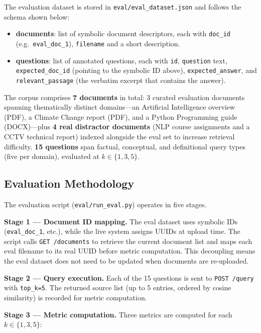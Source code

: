\documentclass[10pt]{article}
\begin{document}
The evaluation dataset is stored in \texttt{eval/eval\_dataset.json} and
follows the schema shown below:

\begin{itemize}
  \item \textbf{documents}: list of symbolic document descriptors, each with
        \texttt{doc\_id} (e.g.\ \texttt{eval\_doc\_1}), \texttt{filename}
 and a short description.
  \item \textbf{questions}: list of annotated questions, each with
        \texttt{id}, \texttt{question} text, \texttt{expected\_doc\_id}
        (pointing to the symbolic ID above), \texttt{expected\_answer}, and
        \texttt{relevant\_passage} (the verbatim excerpt that contains the answer).
\end{itemize}

The corpus comprises \textbf{7 documents} in total: 3 curated evaluation
documents spanning thematically distinct domains---an Artificial Intelligence
overview (PDF), a Climate Change report (PDF), and a Python Programming guide
(DOCX)---plus \textbf{4 real distractor documents} (NLP course assignments and
a CCTV technical report) indexed alongside the eval set to increase retrieval
difficulty.
\textbf{15 questions} span factual, conceptual, and definitional query types
(five per domain), evaluated at $k \in \{1, 3, 5\}$.

\subsection{Evaluation Methodology}

The evaluation script (\texttt{eval/run\_eval.py}) operates in five stages.

\textbf{Stage 1 — Document ID mapping.}
The eval dataset uses symbolic IDs (\texttt{eval\_doc\_1}, etc.), while the
live system assigns UUIDs at upload time.
The script calls \texttt{GET /documents} to retrieve the current document list
and maps each eval filename to its real UUID before metric computation.
This decoupling means the eval dataset does not need to be updated when
documents are re-uploaded.

\textbf{Stage 2 — Query execution.}
Each of the 15 questions is sent to \texttt{POST /query} with
\texttt{top\_k=5}.
The returned source list (up to 5 entries, ordered by cosine similarity)
is recorded for metric computation.

\textbf{Stage 3 — Metric computation.}
Three metrics are computed for each $k \in \{1, 3, 5\}$:
\end{document}
